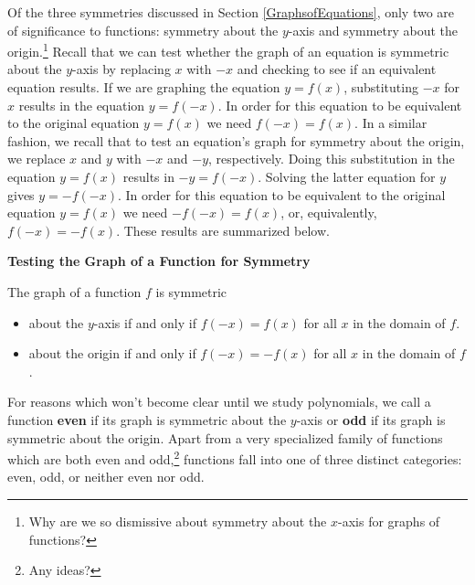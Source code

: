 \medskip

Of the three symmetries discussed in Section \ref{GraphsofEquations}, only two are of significance to functions:  symmetry about the $y$-axis and symmetry about the origin.\footnote{Why are we so dismissive about symmetry about the $x$-axis for graphs of functions?}  Recall that we can test whether the graph of an equation is symmetric about the $y$-axis by replacing $x$ with $-x$ and checking to see if an equivalent equation results.  If we are graphing the equation $y=f(x)$, substituting $-x$ for $x$ results in the equation $y=f(-x)$.  In order for this equation to be equivalent to the original equation $y=f(x)$ we need $f(-x) = f(x)$.  In a similar fashion, we recall that to test an equation's graph for symmetry about the origin, we replace $x$ and $y$ with $-x$ and $-y$, respectively.  Doing this substitution in the equation $y = f(x)$ results in $-y = f(-x)$.  Solving the latter equation for $y$ gives $y = -f(-x)$.  In order for this equation to be equivalent to the original equation $y=f(x)$ we need $-f(-x) = f(x)$, or, equivalently, $f(-x) = -f(x)$.  These results are summarized below.

\medskip

\colorbox{ResultColor}{\bbm


\centerline{\textbf{Testing the Graph of a Function for Symmetry}}

\smallskip

\hspace{.17in} The graph of a function $f$ is symmetric 

\begin{itemize}

\item  about the $y$-axis if and only if $f(-x) = f(x)$ for all $x$ in the domain of $f$.

\item  about the origin if and only if $f(-x) = -f(x)$ for all $x$ in the domain of $f$.

\end{itemize}

\ebm}

\medskip

For reasons which won't become clear until we study polynomials, we call a function \textbf{even} if its graph is symmetric about the $y$-axis or \textbf{odd} if its graph is symmetric about the origin.  Apart from a very specialized family of functions which are both even and odd,\footnote{Any ideas?} functions fall into one of three distinct categories: even, odd, or neither even nor odd.  

